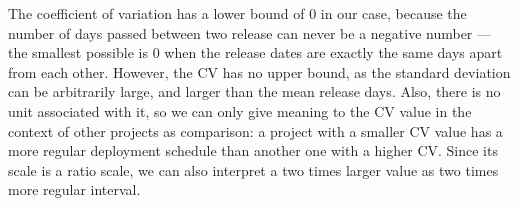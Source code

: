 \begin{table}
    \centering
    \caption{Release regularities for major, minor and patch releases.}
    \label{tab:regularity}
\end{table}

The coefficient of variation has a lower bound of $0$ in our case, because the number of days passed between two release can never be a negative number — the smallest possible is $0$ when the release dates are exactly the same days apart from each other. However, the CV has no upper bound, as the standard deviation can be arbitrarily large, and larger than the mean release days. Also, there is no unit associated with it, so we can only give meaning to the CV value in the context of other projects as comparison: a project with a smaller CV value has a more regular deployment schedule than another one with a higher CV. Since its scale is a ratio scale, we can also interpret a two times larger value as two times more regular interval.


